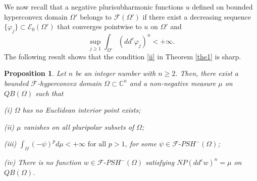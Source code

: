 \documentclass[3p,times]{elsarticle}
\numberwithin{equation}{section}
\newtheorem{proposition}[theorem]{Proposition}
\newtheorem{The main theorem}[theorem]{The main theorem}
\theoremstyle{definition}
\begin{document}
We now recall that a  negative plurisubharmonic functions $u$ defined on bounded hyperconvex domain $\Omega'$ belongs to $\mathcal F(\Omega')$ if  there exist a decreasing sequence $\{\varphi _j\} \subset \mathcal E_0(\Omega')$ that converges pointwise to $u$ on $\Omega'$ and 
$$\sup_{j\geq 1} \int_{ \Omega '} (dd^c \varphi_j )^n<+\infty.$$ 
The following  result  shows that  the condition \eqref{ii} in Theorem \ref{the1} is sharp. 


\begin{proposition} 
Let $n$ be an integer number with  $n\geq 2$. Then, there exist a bounded $\mathcal F$-hyperconvex domain $\Omega \subset \mathbb C^n$ and a non-negative measure $\mu$ on $QB( \Omega)$  such that 

(i) $\Omega$ has no Euclidean interior point exists;

(ii) $\mu$ vanishes on all pluripolar subsets of $ \Omega$;

(iii) $\int_{  \Omega}(-\psi )^p d\mu<+\infty \text{ for all } p>1$, for some $ \psi \in \mathcal F \text{-} PSH^-(\Omega)$;

(iv) There is no function $w\in\mathcal  F \text{-} PSH^-(  \Omega )$ satisfying $NP(dd^c w)^n=\mu$ on $QB( \Omega)$. 
\end{proposition}
\end{document}

